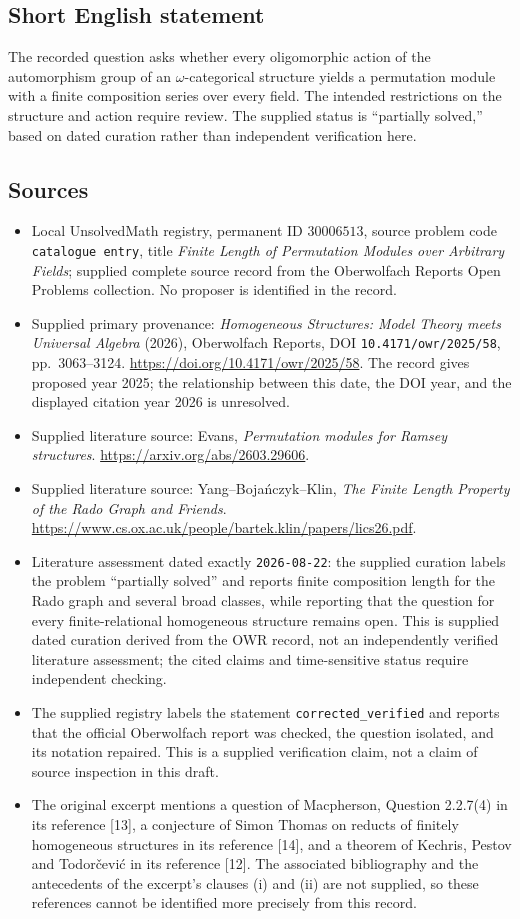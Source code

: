 \documentclass[11pt]{article}
\begin{document}
\subsection{Short English statement}
The recorded question asks whether every oligomorphic action of the automorphism group of an \(\omega\)-categorical structure yields a permutation module with a finite composition series over every field. The intended restrictions on the structure and action require review. The supplied status is ``partially solved,'' based on dated curation rather than independent verification here.
\subsection{Sources}
\begin{itemize}
\item Local UnsolvedMath registry, permanent ID \(30006513\), source problem code \texttt{catalogue entry}, title \emph{Finite Length of Permutation Modules over Arbitrary Fields}; supplied complete source record from the Oberwolfach Reports Open Problems collection. No proposer is identified in the record.
\item Supplied primary provenance: \emph{Homogeneous Structures: Model Theory meets Universal Algebra} (2026), Oberwolfach Reports, DOI \texttt{10.4171/owr/2025/58}, pp.\ 3063--3124. \url{https://doi.org/10.4171/owr/2025/58}. The record gives proposed year 2025; the relationship between this date, the DOI year, and the displayed citation year 2026 is unresolved.
\item Supplied literature source: Evans, \emph{Permutation modules for Ramsey structures}. \url{https://arxiv.org/abs/2603.29606}.
\item Supplied literature source: Yang--Boja\'nczyk--Klin, \emph{The Finite Length Property of the Rado Graph and Friends}. \url{https://www.cs.ox.ac.uk/people/bartek.klin/papers/lics26.pdf}.
\item Literature assessment dated exactly \texttt{2026-08-22}: the supplied curation labels the problem ``partially solved'' and reports finite composition length for the Rado graph and several broad classes, while reporting that the question for every finite-relational homogeneous structure remains open. This is supplied dated curation derived from the OWR record, not an independently verified literature assessment; the cited claims and time-sensitive status require independent checking.
\item The supplied registry labels the statement \texttt{corrected\_verified} and reports that the official Oberwolfach report was checked, the question isolated, and its notation repaired. This is a supplied verification claim, not a claim of source inspection in this draft.
\item The original excerpt mentions a question of Macpherson, Question 2.2.7(4) in its reference [13], a conjecture of Simon Thomas on reducts of finitely homogeneous structures in its reference [14], and a theorem of Kechris, Pestov and Todor\v{c}evi\'c in its reference [12]. The associated bibliography and the antecedents of the excerpt's clauses (i) and (ii) are not supplied, so these references cannot be identified more precisely from this record.
\end{itemize}
\end{document}
